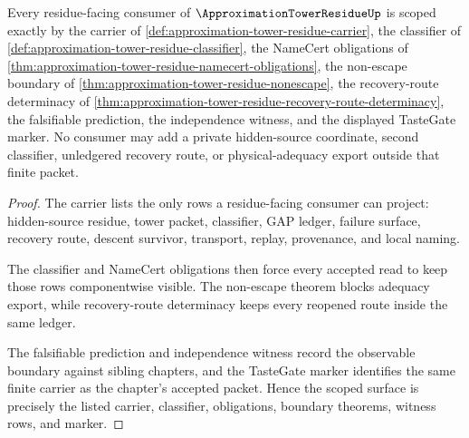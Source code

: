 \begin{theorem}
\label{thm:approximation-tower-residue-scope-lock}
Every residue-facing consumer of $\ApproximationTowerResidueUp$ is scoped exactly by the carrier of \autoref{def:approximation-tower-residue-carrier}, the classifier of \autoref{def:approximation-tower-residue-classifier}, the NameCert obligations of \autoref{thm:approximation-tower-residue-namecert-obligations}, the non-escape boundary of \autoref{thm:approximation-tower-residue-nonescape}, the recovery-route determinacy of \autoref{thm:approximation-tower-residue-recovery-route-determinacy}, the falsifiable prediction, the independence witness, and the displayed TasteGate marker. No consumer may add a private hidden-source coordinate, second classifier, unledgered recovery route, or physical-adequacy export outside that finite packet.
\end{theorem}
\begin{proof}
The carrier lists the only rows a residue-facing consumer can project: hidden-source residue, tower packet, classifier, GAP ledger, failure surface, recovery route, descent survivor, transport, replay, provenance, and local naming.

The classifier and NameCert obligations then force every accepted read to keep those rows componentwise visible. The non-escape theorem blocks adequacy export, while recovery-route determinacy keeps every reopened route inside the same ledger.

The falsifiable prediction and independence witness record the observable boundary against sibling chapters, and the TasteGate marker identifies the same finite carrier as the chapter's accepted packet. Hence the scoped surface is precisely the listed carrier, classifier, obligations, boundary theorems, witness rows, and marker.
\end{proof}


